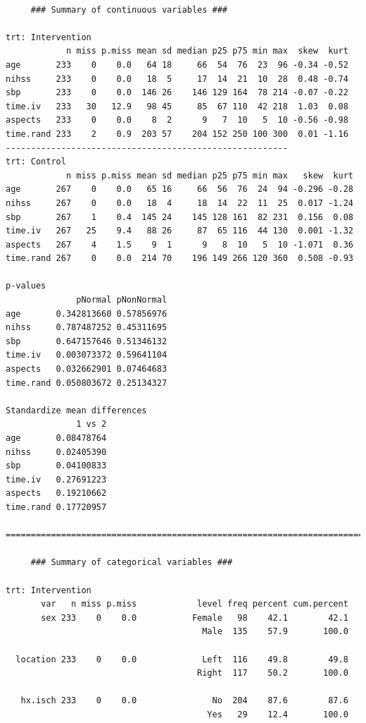\documentclass[]{book}
\theoremstyle{definition}
\theoremstyle{definition}
\theoremstyle{definition}
\theoremstyle{remark}
\begin{document}
\begin{verbatim}

     ### Summary of continuous variables ###

trt: Intervention
            n miss p.miss mean sd median p25 p75 min max  skew  kurt
age       233    0    0.0   64 18     66  54  76  23  96 -0.34 -0.52
nihss     233    0    0.0   18  5     17  14  21  10  28  0.48 -0.74
sbp       233    0    0.0  146 26    146 129 164  78 214 -0.07 -0.22
time.iv   233   30   12.9   98 45     85  67 110  42 218  1.03  0.08
aspects   233    0    0.0    8  2      9   7  10   5  10 -0.56 -0.98
time.rand 233    2    0.9  203 57    204 152 250 100 300  0.01 -1.16
-------------------------------------------------------- 
trt: Control
            n miss p.miss mean sd median p25 p75 min max   skew  kurt
age       267    0    0.0   65 16     66  56  76  24  94 -0.296 -0.28
nihss     267    0    0.0   18  4     18  14  22  11  25  0.017 -1.24
sbp       267    1    0.4  145 24    145 128 161  82 231  0.156  0.08
time.iv   267   25    9.4   88 26     87  65 116  44 130  0.001 -1.32
aspects   267    4    1.5    9  1      9   8  10   5  10 -1.071  0.36
time.rand 267    0    0.0  214 70    196 149 266 120 360  0.508 -0.93

p-values
              pNormal pNonNormal
age       0.342813660 0.57856976
nihss     0.787487252 0.45311695
sbp       0.647157646 0.51346132
time.iv   0.003073372 0.59641104
aspects   0.032662901 0.07464683
time.rand 0.050803672 0.25134327

Standardize mean differences
              1 vs 2
age       0.08478764
nihss     0.02405390
sbp       0.04100833
time.iv   0.27691223
aspects   0.19210662
time.rand 0.17720957

=======================================================================================

     ### Summary of categorical variables ### 

trt: Intervention
       var   n miss p.miss            level freq percent cum.percent
       sex 233    0    0.0           Female   98    42.1        42.1
                                       Male  135    57.9       100.0
                                                                    
  location 233    0    0.0             Left  116    49.8        49.8
                                      Right  117    50.2       100.0
                                                                    
   hx.isch 233    0    0.0               No  204    87.6        87.6
                                        Yes   29    12.4       100.0
                                                                    

\end{verbatim}
\end{document}
